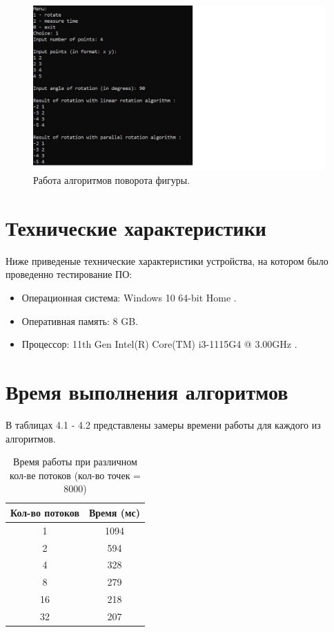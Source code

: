 \documentclass[12pt]{report}
\begin{document}
	\begin{figure}[h]
		\begin{center}
			\includegraphics[scale=1]{example.jpg}
			\caption{Работа алгоритмов поворота фигуры.}
		\end{center}
	\end{figure}
	
	\section{Технические характеристики}
	
	Ниже приведеные технические характеристики устройства, на котором было проведенно тестирование ПО:
	
	\begin{itemize}
		
		\item Операционная система: Windows 10 64-bit Home \cite{home}.
		
		\item Оперативная память: 8 GB.
		
		\item Процессор: 11th Gen Intel(R) Core(TM) i3-1115G4 @ 3.00GHz
		\cite{i3}.
		
	\end{itemize}
	
	\section{Время выполнения алгоритмов}
	В таблицах 4.1 - 4.2 представлены замеры времени работы для каждого из алгоритмов.
	
	\begin{table} [h!]
		\caption{Время работы при различном кол-ве потоков (кол-во точек = 8000)}
		\begin{center}
			\begin{tabular}{|c c|} 
				\hline
				Кол-во потоков & Время (мс) \\  
				\hline
				1 & 1094 \\
				\hline
				2 & 594 \\
				\hline
				4 & 328 \\
				\hline
				8 & 279 \\
				\hline
				16 & 218 \\
				\hline
				32 & 207 \\
				\hline
			\end{tabular}
		\end{center}
	\end{table}
\end{document}
